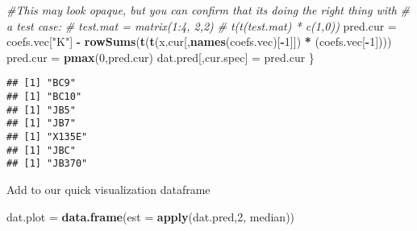 \documentclass[
]{article}
\newenvironment{Shaded}{\begin{snugshade}}{\end{snugshade}}
\newcommand{\AttributeTok}[1]{\textcolor[rgb]{0.13,0.29,0.53}{#1}}
\newcommand{\CommentTok}[1]{\textcolor[rgb]{0.56,0.35,0.01}{\textit{#1}}}
\newcommand{\DecValTok}[1]{\textcolor[rgb]{0.00,0.00,0.81}{#1}}
\newcommand{\FunctionTok}[1]{\textcolor[rgb]{0.13,0.29,0.53}{\textbf{#1}}}
\newcommand{\NormalTok}[1]{#1}
\newcommand{\OtherTok}[1]{\textcolor[rgb]{0.56,0.35,0.01}{#1}}
\newcommand{\SpecialCharTok}[1]{\textcolor[rgb]{0.81,0.36,0.00}{\textbf{#1}}}
\newcommand{\StringTok}[1]{\textcolor[rgb]{0.31,0.60,0.02}{#1}}
\begin{document}
\begin{Shaded}
\begin{Highlighting}[]
  \CommentTok{\#This may look opaque, but you can confirm that it\textquotesingle{}s doing the right thing with }
  \CommentTok{\# a test case:}
  \CommentTok{\# test.mat = matrix(1:4, 2,2)}
  \CommentTok{\# t(t(test.mat) * c(1,0))}
\NormalTok{  pred.cur }\OtherTok{=}\NormalTok{ coefs.vec[}\StringTok{"K"}\NormalTok{] }\SpecialCharTok{{-}} 
    \FunctionTok{rowSums}\NormalTok{(}\FunctionTok{t}\NormalTok{(}\FunctionTok{t}\NormalTok{(x.cur[,}\FunctionTok{names}\NormalTok{(coefs.vec)[}\SpecialCharTok{{-}}\DecValTok{1}\NormalTok{]]) }\SpecialCharTok{*}\NormalTok{ (coefs.vec[}\SpecialCharTok{{-}}\DecValTok{1}\NormalTok{])))}
\NormalTok{  pred.cur }\OtherTok{=} \FunctionTok{pmax}\NormalTok{(}\DecValTok{0}\NormalTok{,pred.cur)}
\NormalTok{  dat.pred[,cur.spec] }\OtherTok{=}\NormalTok{ pred.cur}
\NormalTok{\}}
\end{Highlighting}
\end{Shaded}

\begin{verbatim}
## [1] "BC9"
## [1] "BC10"
## [1] "JB5"
## [1] "JB7"
## [1] "X135E"
## [1] "JBC"
## [1] "JB370"
\end{verbatim}

\begin{Shaded}
\end{Shaded}

Add to our quick visualization dataframe

\begin{Shaded}
\begin{Highlighting}[]
\NormalTok{dat.plot }\OtherTok{=} \FunctionTok{data.frame}\NormalTok{(}\AttributeTok{est =} \FunctionTok{apply}\NormalTok{(dat.pred,}\DecValTok{2}\NormalTok{, median))}
\end{Highlighting}
\end{Shaded}
\end{document}
